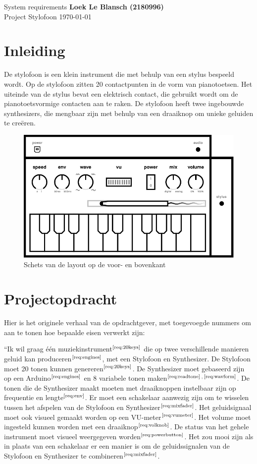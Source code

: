 \documentclass[12pt, a4paper, dutch]{article}
\newcommand{\req}[1]{$^{\text{\ref{req:#1}}}$}
\newcommand{\up}[1]{$^{\text{#1}}$}
\begin{document}
System requirements \hfill \textbf{Loek Le Blansch (2180996)}\\
Project Stylofoon \hfill \today
\medskip

\section{Inleiding}

De stylofoon is een klein instrument die met behulp van een stylus bespeeld wordt. Op
de stylofoon zitten 20 contactpunten in de vorm van pianotoetsen. Het uiteinde van de
stylus bevat een elektrisch contact, die gebruikt wordt om de pianotoetsvormige
contacten aan te raken. De stylofoon heeft twee ingebouwde synthesizers, die mengbaar
zijn met behulp van een draaiknop om unieke geluiden te cre\"eren.

\begin{figure}[H]
	\centering
	\includegraphics{figs/case-layout-sketch.pdf}
	\caption{Schets van de layout op de voor- en bovenkant}
\end{figure}

\section{Projectopdracht}

Hier is het originele verhaal van de opdrachtgever, met toegevoegde nummers om aan te
tonen hoe bepaalde eisen verwerkt zijn:

``Ik wil graag één muziekinstrument\req{20keys} die op twee verschillende manieren
geluid kan produceren\req{engines}, met een Stylofoon en Synthesizer. De Stylofoon
moet 20 tonen kunnen genereren\req{20keys}. De Synthesizer moet gebaseerd zijn op een
Arduino\req{engines} en 8 variabele tonen maken\req{readtone}\up{,}\req{wavform}. De
tonen die de Synthesizer maakt moeten met draaiknoppen instelbaar zijn op frequentie
en lengte\req{env}. Er moet een schakelaar aanwezig zijn om te wisselen tussen
het afspelen van de Stylofoon en Synthesizer\req{mixfader}. Het geluidsignaal moet
ook visueel gemaakt worden op een VU-meter\req{vumeter}. Het volume moet ingesteld
kunnen worden met een draaiknop\req{volknob}. De status van het gehele instrument
moet visueel weergegeven worden\req{powerbutton}. Het zou mooi zijn als in plaats van
een schakelaar er een manier is om de geluidssignalen van de Stylofoon en Synthesizer
te combineren\req{mixfader}.
\end{document}
